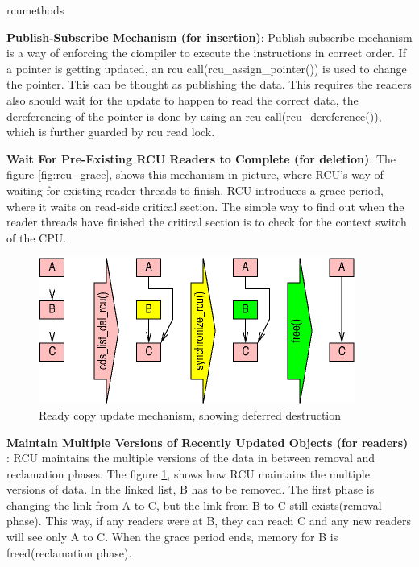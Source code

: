\begin{labeling}{rcumethods}
\item[\textbf{Publish-Subscribe Mechanism (for insertion)}:]
Publish subscribe mechanism is a way of enforcing the ciompiler to execute the instructions in correct order. If a pointer is getting updated, an rcu call(rcu\_assign\_pointer())  is used to change the pointer. This can be thought as publishing the data. This requires the readers also should wait for the update to happen to read the correct data, the dereferencing of the pointer is done by using an rcu call(rcu\_dereference()), which is further guarded by rcu read lock.

\item[\textbf{Wait For Pre-Existing RCU Readers to Complete (for deletion)}:]
The figure \ref{fig:rcu_grace}, shows this mechanism in picture, where RCU's way of waiting for existing reader threads to finish. RCU introduces a grace period, where it waits on read-side critical section. The simple way to find out when the reader threads have finished the critical section is to check for the context switch of the CPU. 

\begin{figure}[h]
\centering
\includegraphics[width=0.7\linewidth]{figures/rcu}
\caption{Ready copy update mechanism, showing deferred destruction \cite{whatisrcu}}
\label{fig:rcu}
\end{figure}

\item[\textbf{Maintain Multiple Versions of Recently Updated Objects (for readers)}]:
RCU maintains the multiple versions of the data in between removal and reclamation phases. The figure \ref{fig:rcu}, shows how RCU maintains the multiple versions of data. In the linked list, B has to be removed. The first phase is changing the link from A to C, but the link from B to C still exists(removal phase). This way, if any readers were at B, they can reach C and any new readers will see only A to C. When the grace period ends, memory for B is freed(reclamation phase).
\end{labeling}

